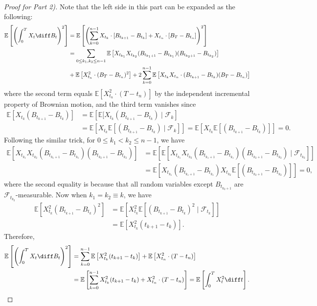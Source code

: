 \begin{proof}[Proof for Part 2)]
Note that the left side in this part can be expanded as the following:
\begin{align*}
\mathbb{E}\left[
\left(\int_0^TX_t\diff B_t\right)^2
\right]&=
\mathbb{E}\left[
\left(
\sum_{k=0}^{n-1}X_{t_k}\cdot[B_{t_{k+1}} -B_{t_k}] + X_{t_n}\cdot[B_{T} -B_{t_n}]
\right)^2
\right]\\
&=\sum_{0\le k_1,k_2\le n-1}\mathbb{E}\left[X_{t_{k_1}}X_{t_{k_2}}(B_{t_{k_1+1}} -B_{t_{k_1}})(B_{t_{k_2+1}} -B_{t_{k_2}})\right]\\
&+\mathbb{E}\left[
X_{t_n}^2\cdot(B_{T} -B_{t_n})^2
\right]+2\sum_{k=0}^{n-1}\mathbb{E}\left[
X_{t_k}X_{t_n}\cdot(B_{t_{k+1}} -B_{t_k})(B_{T} -B_{t_n})
\right]
\end{align*}
where the second term equals $\mathbb{E}\left[
X_{t_n}^2\cdot(T-t_n)
\right]$ by the independent incremental property of Brownian motion,
and the third term vanishes since
\begin{align*}
\mathbb{E}\left[
X_{t_k}(B_{t_{k+1}} -B_{t_k})
\right]&=
\mathbb{E}\left[
\mathbb{E}[X_{t_k}(B_{t_{k+1}} -B_{t_k})\mid\mathcal{F}_k\right]\\
&=\mathbb{E}\left[X_{t_k}
\mathbb{E}[(B_{t_{k+1}} -B_{t_k})\mid\mathcal{F}_k]
\right]=\mathbb{E}\left[X_{t_k}
\mathbb{E}[(B_{t_{k+1}} -B_{t_k})]
\right]=0.
\end{align*}
Following the similar trick, for $0\le k_1<k_2\le n-1$, we have
\begin{align*}
\mathbb{E}\left[X_{t_{k_1}}X_{t_{k_2}}(B_{t_{k_1+1}} -B_{t_{k_1}})(B_{t_{k_2+1}} -B_{t_{k_2}})\right]
&=
\mathbb{E}\left[\mathbb{E}[X_{t_{k_1}}X_{t_{k_2}}(B_{t_{k_1+1}} -B_{t_{k_1}})(B_{t_{k_2+1}} -B_{t_{k_2}})\mid\mathcal{F}_{t_{k_2}}]\right]\\
&=\mathbb{E}\left[
X_{t_{k_1}}(B_{t_{k_1+1}} -B_{t_{k_1}})X_{t_{k_2}}
\mathbb{E}[(B_{t_{k_2+1}} -B_{t_{k_2}})]\right]=0,
\end{align*}
where the second equality is because that all random variables except $B_{t_{k_2+1}}$ are $\mathcal{F}_{t_{k_2}}$-measurable.
Now when $k_1=k_2\equiv k$, we have
\begin{align*}
\mathbb{E}\left[X_{t_{k}}^2(B_{t_{k+1}} -B_{t_{k}})^2\right]
&=
\mathbb{E}\left[X_{t_{k}}^2\mathbb{E}[(B_{t_{k+1}} -B_{t_{k}})^2\mid\mathcal{F}_{t_k}]\right]\\
&=\mathbb{E}\left[X_{t_{k}}^2(t_{k+1} - t_k)\right].
\end{align*}
Therefore, 
\begin{align*}
\mathbb{E}\left[
\left(\int_0^TX_t\diff B_t\right)^2
\right]&=\sum_{k=0}^{n-1}\mathbb{E}\left[X_{t_{k}}^2(t_{k+1} - t_k)\right]+\mathbb{E}\left[
X_{t_n}^2\cdot(T-t_n)
\right]\\
&=\mathbb{E}\left[
\sum_{k=0}^{n-1}X_{t_{k}}^2(t_{k+1} - t_k) + X_{t_n}^2\cdot(T-t_n)
\right]=\mathbb{E}\left[
\int_0^TX_t^2\diff t
\right].
\end{align*}
\end{proof}
